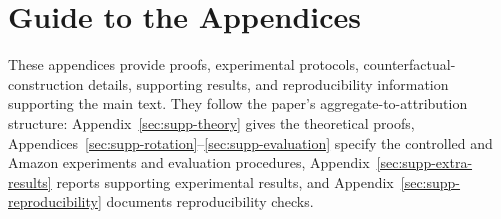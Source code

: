 

\appendix


\makeatletter
{}
\makeatother
\renewcommand{\thealgocf}{\thesection.\arabic{algocf}}

\providecommand{\E}{\mathbb{E}}
\providecommand{\Prb}{\mathbb{P}}
\providecommand{\R}{\mathbb{R}}
\providecommand{\1}{\mathbf{1}}

\providecommand{\suppnote}[1]{%
  \textcolor{red!70!black}{\textbf{[TODO: #1]}}}

\providecommand{\placeholderfigure}[2]{%
  \begin{figure}[t]
    \centering
    \fbox{%
      \parbox[c][1.35in][c]{0.92\columnwidth}{%
        \centering\textbf{Figure placeholder}\\[4pt]#1}}
    \caption{#2}
  \end{figure}}

\providecommand{\placeholderfigurewide}[2]{%
  \begin{figure}[t]
    \centering
    \fbox{%
      \parbox[c][1.55in][c]{0.94\textwidth}{%
        \centering\textbf{Wide figure placeholder}\\[4pt]#1}}
    \caption{#2}
  \end{figure}}

\section{Guide to the Appendices}
\label{sec:supp-guide}

These appendices provide proofs, experimental protocols,
counterfactual-construction details, supporting results, and reproducibility
information supporting the main text. They follow the paper's
aggregate-to-attribution structure: Appendix~\ref{sec:supp-theory} gives the
theoretical proofs, Appendices~\ref{sec:supp-rotation}--\ref{sec:supp-evaluation}
specify the controlled and Amazon experiments and evaluation procedures,
Appendix~\ref{sec:supp-extra-results} reports supporting experimental results,
and Appendix~\ref{sec:supp-reproducibility} documents reproducibility checks.

